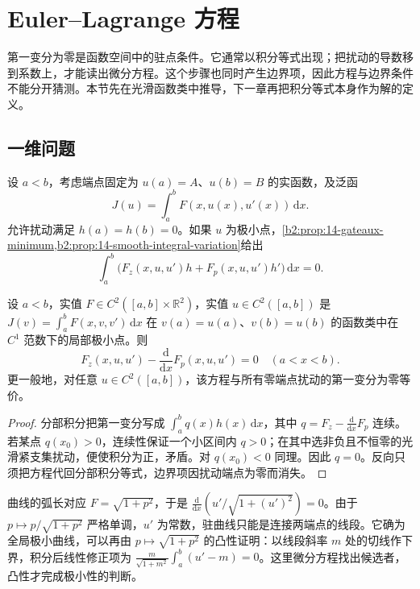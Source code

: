 \section{Euler–Lagrange 方程}
\label{b2:sec:1402}

第一变分为零是函数空间中的驻点条件。它通常以积分等式出现；把扰动的导数移到系数上，才能读出微分方程。这个步骤也同时产生边界项，因此方程与边界条件不能分开猜测。本节先在光滑函数类中推导，下一章再把积分等式本身作为解的定义。

\subsection{一维问题}
\label{b2:subsec:140201}

设 \(a<b\)，考虑端点固定为 \(u(a)=A\)、\(u(b)=B\) 的实函数，及泛函
\[J(u)=\int_a^b F(x,u(x),u'(x))\,\mathrm dx.\]
允许扰动满足 \(h(a)=h(b)=0\)。如果 \(u\) 为极小点，\cref{b2:prop:14-gateaux-minimum,b2:prop:14-smooth-integral-variation}给出
\[\int_a^b\bigl(F_z(x,u,u')h+F_p(x,u,u')h'\bigr)\,\mathrm dx=0.\]

\begin{theorem}
\label{b2:thm:14-euler-lagrange-one}
设 \(a<b\)，实值 \(F\in C^2([a,b]\times\mathbb R^2)\)，实值 \(u\in C^2([a,b])\) 是 \(J(v)=\int_a^bF(x,v,v')\,\mathrm dx\) 在 \(v(a)=u(a)\)、\(v(b)=u(b)\) 的函数类中在 \(C^1\) 范数下的局部极小点。则
\[F_z(x,u,u')-\frac{\mathrm d}{\mathrm dx}F_p(x,u,u')=0\quad(a<x<b).\]
更一般地，对任意 \(u\in C^2([a,b])\)，该方程与所有零端点扰动的第一变分为零等价。
\end{theorem}
\begin{proof}
分部积分把第一变分写成 \(\int_a^b q(x)h(x)\,\mathrm dx\)，其中 \(q=F_z-\frac{\mathrm d}{\mathrm dx}F_p\) 连续。若某点 \(q(x_0)>0\)，连续性保证一个小区间内 \(q>0\)；在其中选非负且不恒零的光滑紧支集扰动，便使积分为正，矛盾。对 \(q(x_0)<0\) 同理。因此 \(q=0\)。反向只须把方程代回分部积分等式，边界项因扰动端点为零而消失。
\end{proof}

曲线的弧长对应 \(F=\sqrt{1+p^2}\)，于是 \(\frac{\mathrm d}{\mathrm dx}(u'/\sqrt{1+(u')^2})=0\)。由于 \(p\mapsto p/\sqrt{1+p^2}\) 严格单调，\(u'\) 为常数，驻曲线只能是连接两端点的线段。它确为全局极小曲线，可以再由 \(p\mapsto\sqrt{1+p^2}\) 的凸性证明：以线段斜率 \(m\) 处的切线作下界，积分后线性修正项为 \(\frac{m}{\sqrt{1+m^2}}\int_a^b(u'-m)=0\)。这里微分方程找出候选者，凸性才完成极小性的判断。

\ProseParagraphBreak


